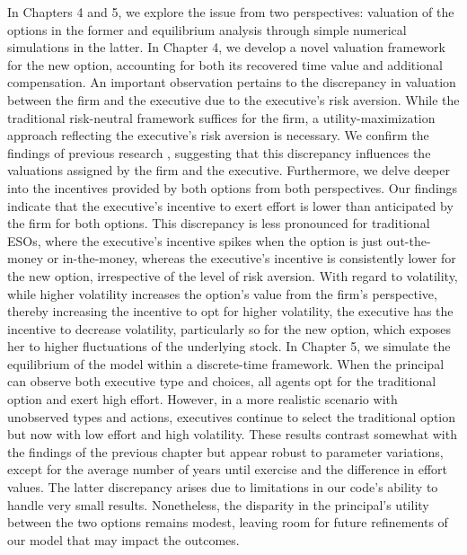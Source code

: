 In Chapters 4 and 5, we explore the issue from two perspectives: valuation of the options in the former and equilibrium analysis through simple numerical simulations in the latter. In Chapter 4, we develop a novel valuation framework for the new option, accounting for both its recovered time value and additional compensation. An important observation pertains to the discrepancy in valuation between the firm and the executive due to the executive's risk aversion. While the traditional risk-neutral framework suffices for the firm, a utility-maximization approach reflecting the executive's risk aversion is necessary. We confirm the findings of previous research \citep{carpenter1998exercise}, suggesting that this discrepancy influences the valuations assigned by the firm and the executive. Furthermore, we delve deeper into the incentives provided by both options from both perspectives. Our findings indicate that the executive's incentive to exert effort is lower than anticipated by the firm for both options. This discrepancy is less pronounced for traditional ESOs, where the executive's incentive spikes when the option is just out-the-money or in-the-money, whereas the executive's incentive is consistently lower for the new option, irrespective of the level of risk aversion. With regard to volatility, while higher volatility increases the option's value from the firm's perspective, thereby increasing the incentive to opt for higher volatility, the executive has the incentive to decrease volatility, particularly so for the new option, which exposes her to higher fluctuations of the underlying stock.
In Chapter 5, we simulate the equilibrium of the model within a discrete-time framework. When the principal can observe both executive type and choices, all agents opt for the traditional option and exert high effort. However, in a more realistic scenario with unobserved types and actions, executives continue to select the traditional option but now with low effort and high volatility. These results contrast somewhat with the findings of the previous chapter but appear robust to parameter variations, except for the average number of years until exercise and the difference in effort values. The latter discrepancy arises due to limitations in our code's ability to handle very small results. Nonetheless, the disparity in the principal's utility between the two options remains modest, leaving room for future refinements of our model that may impact the outcomes.